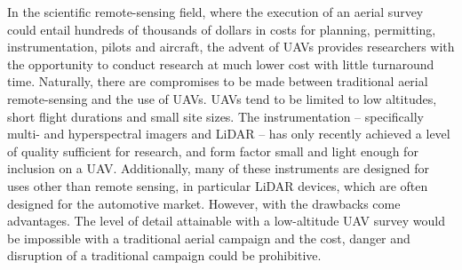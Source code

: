 \documentclass[doc]{apa6}
\begin{document}

In the scientific remote-sensing field, where the execution of an aerial survey could entail hundreds of thousands of dollars in costs for planning, permitting, instrumentation, pilots and aircraft, the advent of UAVs provides researchers with the opportunity to conduct research at much lower cost with little turnaround time. Naturally, there are compromises to be made between traditional aerial remote-sensing and the use of UAVs. UAVs tend to be limited to low altitudes, short flight durations and small site sizes. The instrumentation -- specifically multi- and hyperspectral imagers and LiDAR -- has only recently achieved a level of quality sufficient for research, and form factor small and light enough for inclusion on a UAV. Additionally, many of these instruments are designed for uses other than remote sensing, in particular LiDAR devices, which are often designed for the automotive market. However, with the drawbacks come advantages. The level of detail attainable with a low-altitude UAV survey would be impossible with a traditional aerial campaign and the cost, danger and disruption of a traditional campaign could be prohibitive.
\end{document}
